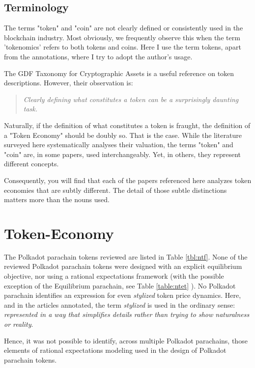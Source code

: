 \documentclass[11pt]{article}
\begin{document}
\subsection{Terminology}

The terms "token" and "coin" are not clearly defined or consistently used in the blockchain industry. Most obviously, we frequently observe this when the term 'tokenomics' refers to both tokens and coins. Here I use the term tokens, apart from the annotations, where I try to adopt the author's usage.

The GDF Taxonomy for Cryptographic Assets\autocite{gbbc19a} is a useful reference on token descriptions. However, their observation is:

\begin{quote}
    \textit{Clearly defining what constitutes a token can be a surprisingly daunting task.}
\end{quote}

Naturally, if the definition of what constitutes a token is fraught, the definition of a "Token Economy" should be doubly so. That is the case. While the literature surveyed here systematically analyses their valuation, the terms "token" and "coin" are, in some papers, used interchangeably. Yet, in others, they represent different concepts.

Consequently, you will find that each of the papers referenced here analyzes token economies that are subtly different. The detail of those subtle distinctions matters more than the nouns used.

\section{Token-Economy}

The Polkadot parachain tokens reviewed are listed in Table \ref{tbl:ntf}.  None of the reviewed Polkadot parachain tokens were designed with an explicit equilibrium objective, nor using a rational expectations framework (with the possible exception of the Equilibrium parachain, see Table \ref{table:ntet} ). No Polkadot parachain identifies an expression for even \textit{stylized} token price dynamics.  Here, and in the articles annotated, the term \textit{stylized} is used in the ordinary sense: \textit{represented in a way that simplifies details rather than trying to show naturalness or reality}\autocite{ced23stylized}.

Hence, it was not possible to identify, across multiple Polkadot parachains, those elements of rational expectations modeling used in the design of Polkadot parachain tokens. 
\end{document}

